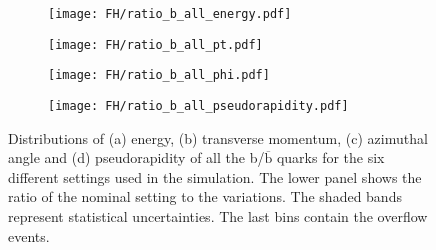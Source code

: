 \begin{figure}[H]
    \centering
    \begin{subfigure}{0.49\textwidth}
        \centering
        \texttt{[image: FH/ratio\_b\_all\_energy.pdf]}
        \caption{}
        \label{app:subfig:Ε(b_all)_FH}
    \end{subfigure}
    \begin{subfigure}{0.49\textwidth}
        \centering
        \texttt{[image: FH/ratio\_b\_all\_pt.pdf]}
        \caption{}
        \label{app:subfig:pt(b_all)_FH}
    \end{subfigure}

    \vspace{0.2cm}
    
    \begin{subfigure}{0.49\textwidth}
        \centering
        \texttt{[image: FH/ratio\_b\_all\_phi.pdf]}
        \caption{}
        \label{app:subfig:phi(b_all)_FH}
    \end{subfigure}
    \begin{subfigure}{0.49\textwidth}
        \centering
        \texttt{[image: FH/ratio\_b\_all\_pseudorapidity.pdf]}
        \caption{}
        \label{app:subfig:eta(b_all)_FH}
    \end{subfigure}
    \caption{Distributions of (a) energy, (b) transverse momentum,  (c) azimuthal angle and (d) pseudorapidity of all the b/$\overline{\text{b}}$ quarks for the six different settings used in the simulation. The lower panel shows the ratio of the nominal setting to the variations. The shaded bands represent statistical uncertainties. The last bins contain the overflow events.}
    \label{app:fig:b_all_FH}
\end{figure}



